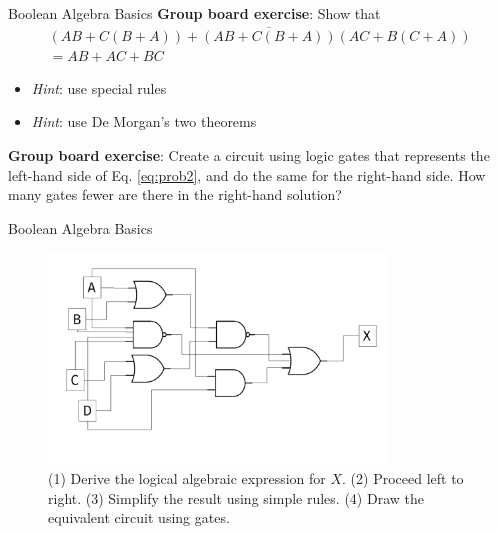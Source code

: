 \documentclass{beamer}
\begin{document}
\begin{frame}{Boolean Algebra Basics}
\small
\textbf{Group board exercise}: Show that
\begin{equation}
\boxed{
\begin{multlined}
(AB+C(B+A))+\overline{(AB+C(B+A))}(AC+B(C+A)) \\ = AB+AC+BC \label{eq:prob2}
\end{multlined}}
\end{equation}
\begin{itemize}
\item \textit{Hint}: use special rules
\item \textit{Hint}: use De Morgan's two theorems
\end{itemize}
\textbf{Group board exercise}: Create a circuit using logic gates that represents the left-hand side of Eq. \ref{eq:prob2}, and do the same for the right-hand side.  How many gates fewer are there in the right-hand solution?
\end{frame}

\begin{frame}{Boolean Algebra Basics}
\begin{figure}
\centering
\includegraphics[width=0.8\textwidth]{figures/MultiGate1.pdf}
\caption{\label{fig:multi1} (1) Derive the logical algebraic expression for $X$.  (2) Proceed left to right.  (3) Simplify the result using simple rules. (4) Draw the equivalent circuit using gates.}
\end{figure}
\end{frame}
\end{document}
